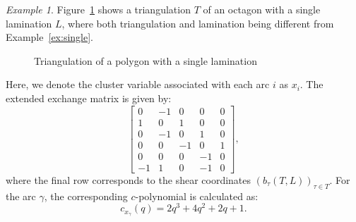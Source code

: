 \documentclass{article}
\theoremstyle{remark}
\newtheorem{example}{Example}
\begin{document}
\begin{example}

Figure~\ref{fig:excpoly} shows a triangulation $T$ of an octagon with a single lamination $L$, where both triangulation and lamination being different from Example~\ref{ex:single}.
    \begin{figure}[H]
    \centering
{}

    \caption{Triangulation of a polygon with a single lamination}
    \label{fig:excpoly}
\end{figure}

Here, we denote the cluster variable associated with each arc $i$ as $x_i$. The extended exchange matrix is given by:
\[
\begin{bmatrix}
    0 & -1 & 0 & 0 & 0 \\
    1 & 0 & 1 & 0 & 0 \\
    0 & -1 & 0 & 1 & 0 \\
    0 & 0 & -1 & 0 & 1 \\
    0 & 0 & 0 & -1 & 0 \\ 
    -1 & 1 & 0 & -1 & 0
\end{bmatrix},
\]
where the final row corresponds to the shear coordinates $(b_\tau(T,L))_{\tau \in T}$. For the arc $\gamma$, the corresponding $c$-polynomial is calculated as:
\[
c_{x_{\gamma}}(q) = 2q^3 + 4q^2 + 2q + 1.
\]
\end{example}
\end{document}
